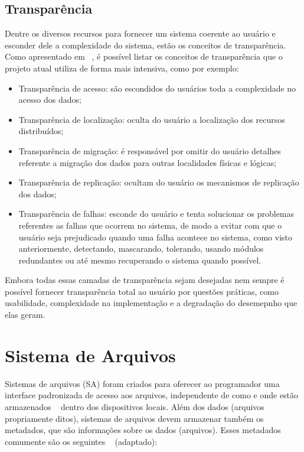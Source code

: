     
    \subsection{Transparência}
    
        Dentre os diversos recursos para fornecer um sistema coerente ao usuário e esconder dele a complexidade do sistema, estão os conceitos de transparência. Como apresentado em ~\cite{tanenbaum}, é possível listar os conceitos de transparência que o projeto atual utiliza de forma mais intensiva, como por exemplo:
    
        \begin{itemize}
            \item Transparência de acesso: são escondidos do usuários toda a complexidade no acesso dos dados;
            
            \item Transparência de localização: oculta do usuário a localização dos recursos distribuídos;
            
            \item Transparência de migração: é responsável por omitir do usuário detalhes referente a migração dos dados para outras localidades físicas e lógicas;
            
            \item Transparência de replicação: ocultam do usuário os mecanismos de replicação dos dados;
            
            \item Transparência de falhas: esconde do usuário e tenta solucionar os problemas referentes as falhas que ocorrem no sistema, de modo a evitar com que o usuário seja prejudicado quando uma falha acontece no sistema, como visto anteriormente, detectando, mascarando, tolerando, usando módulos redundantes ou até mesmo recuperando o sistema quando possível.
        \end{itemize}
    
        Embora todas essas camadas de transparência sejam desejadas nem sempre é possível fornecer transparência total ao usuário por questões práticas, como usabilidade, complexidade na implementação e a degradação do desemepnho que elas geram.

\section {Sistema de Arquivos}
    Sistemas de arquivos (SA) foram criados para oferecer ao programador uma interface padronizada de acesso aos arquivos, independente de como e onde estão armazenados ~\cite{coulouris} dentro dos dispositivos locais. 
    Além dos dados (arquivos propriamente ditos), sistemas de arquivos devem armazenar também os metadados, que são informações sobre os dados (arquivos). Esses metadados comumente são os seguintes ~\cite{coulouris} (adaptado):
    
